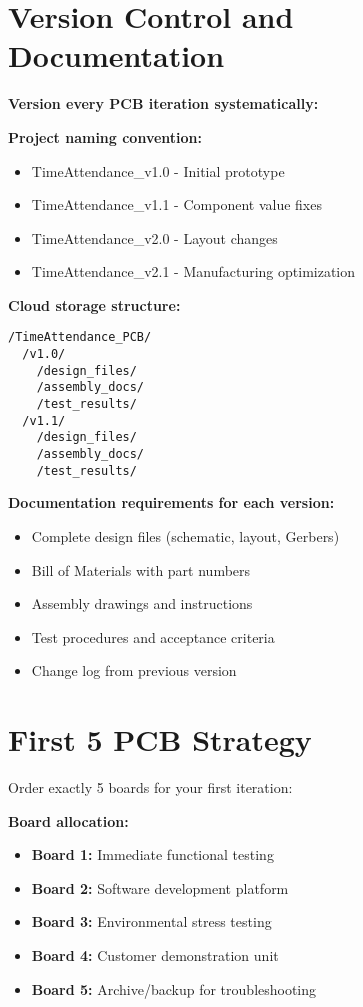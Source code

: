 \section{Version Control and Documentation}

\textbf{Version every PCB iteration systematically:}

\begin{tcolorbox}[colback=blue!10,colframe=blue!75!black,title=PCB Version Control Example]
\textbf{Project naming convention:}
\begin{itemize}
\item TimeAttendance\_v1.0 - Initial prototype
\item TimeAttendance\_v1.1 - Component value fixes
\item TimeAttendance\_v2.0 - Layout changes
\item TimeAttendance\_v2.1 - Manufacturing optimization
\end{itemize}

\textbf{Cloud storage structure:}
\begin{verbatim}
/TimeAttendance_PCB/
  /v1.0/
    /design_files/
    /assembly_docs/
    /test_results/
  /v1.1/
    /design_files/
    /assembly_docs/
    /test_results/
\end{verbatim}
\end{tcolorbox}

\textbf{Documentation requirements for each version:}
\begin{itemize}
\item Complete design files (schematic, layout, Gerbers)
\item Bill of Materials with part numbers
\item Assembly drawings and instructions
\item Test procedures and acceptance criteria
\item Change log from previous version
\end{itemize}

\section{First 5 PCB Strategy}

Order exactly 5 boards for your first iteration:

\textbf{Board allocation:}
\begin{itemize}
\item \textbf{Board 1:} Immediate functional testing
\item \textbf{Board 2:} Software development platform
\item \textbf{Board 3:} Environmental stress testing
\item \textbf{Board 4:} Customer demonstration unit
\item \textbf{Board 5:} Archive/backup for troubleshooting
\end{itemize}

